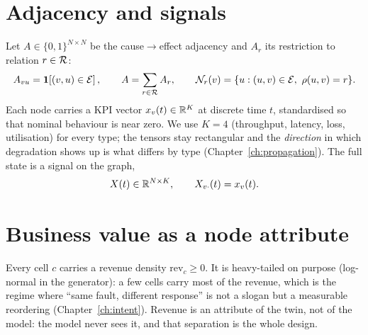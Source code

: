 \section{Adjacency and signals}
Let $A\in\{0,1\}^{N\times N}$ be the cause$\to$effect adjacency and $A_r$ its restriction to
relation $r\in\mathcal{R}$:
\begin{equation}
A_{vu}=\mathbf{1}\!\left[(v,u)\in\mathcal{E}\right],\qquad A=\sum_{r\in\mathcal{R}}A_r,\qquad
\mathcal{N}_r(v)=\{u:(u,v)\in\mathcal{E},\ \rho(u,v)=r\}.
\label{eq:adjacency}
\end{equation}
Each node carries a KPI vector $x_v(t)\in\mathbb{R}^K$ at discrete time $t$, standardised so that nominal
behaviour is near zero. We use $K=4$ (throughput, latency, loss, utilisation) for every type; the
tensors stay rectangular and the \emph{direction} in which degradation shows up is what differs by
type (Chapter~\ref{ch:propagation}). The full state is a signal on the graph,
\begin{equation}
X(t)\in\mathbb{R}^{N\times K},\qquad X_{v\cdot}(t)=x_v(t).
\label{eq:signal}
\end{equation}

\section{Business value as a node attribute}
Every cell $c$ carries a revenue density $\mathrm{rev}_c\ge 0$. It is heavy-tailed on purpose
(log-normal in the generator): a few cells carry most of the revenue, which is the regime where
``same fault, different response'' is not a slogan but a measurable reordering
(Chapter~\ref{ch:intent}). Revenue is an attribute of the twin, not of the model: the model never
sees it, and that separation is the whole design.
